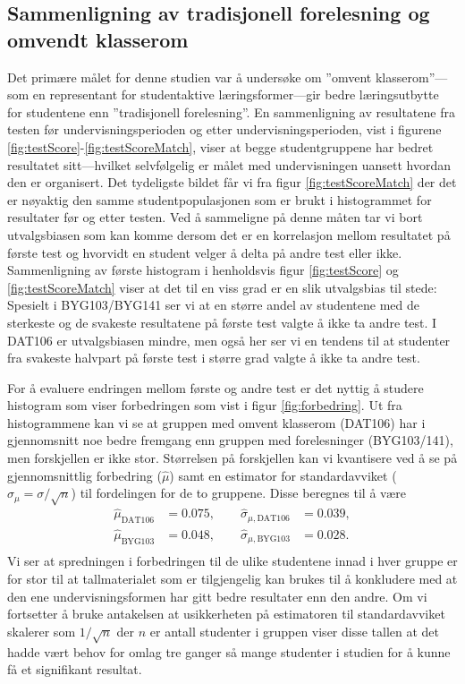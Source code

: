 \documentclass[a4paper,norsk,12pt]{article}
\begin{document}
\subsection{Sammenligning av tradisjonell forelesning og omvendt klasserom}
Det primære målet for denne studien var å undersøke om ''omvent klasserom''---som en representant for studentaktive læringsformer---gir bedre læringsutbytte for studentene enn ''tradisjonell forelesning''. En sammenligning av resultatene fra testen før undervisningsperioden og etter undervisningsperioden, vist i figurene \ref{fig:testScore}-\ref{fig:testScoreMatch}, viser at begge studentgruppene har bedret resultatet sitt---hvilket selvfølgelig er målet med undervisningen uansett hvordan den er organisert. Det tydeligste bildet får vi fra figur \ref{fig:testScoreMatch} der det er nøyaktig den samme studentpopulasjonen som er brukt i histogrammet for resultater før og etter testen. Ved å sammeligne på denne måten tar vi bort utvalgsbiasen som kan komme dersom det er en korrelasjon mellom resultatet på første test og hvorvidt en student velger å delta på andre test eller ikke. Sammenligning av første histogram i henholdsvis figur \ref{fig:testScore} og \ref{fig:testScoreMatch} viser at det til en viss grad er en slik utvalgsbias til stede: Spesielt i BYG103/BYG141 ser vi at en større andel av studentene med de sterkeste og de svakeste resultatene på første test valgte å ikke ta andre test. I DAT106 er utvalgsbiasen mindre, men også her ser vi en tendens til at studenter fra svakeste halvpart på første test i større grad valgte å ikke ta andre test. 

For å evaluere endringen mellom første og andre test er det nyttig å studere histogram som viser forbedringen som vist i figur \ref{fig:forbedring}. Ut fra histogrammene kan vi se at gruppen med omvent klasserom (DAT106) har i gjennomsnitt noe bedre fremgang enn gruppen med forelesninger (BYG103/141), men forskjellen er ikke stor. Størrelsen på forskjellen kan vi kvantisere ved å se på gjennomsnittlig forbedring ($\hat{\mu}$) samt en estimator for standardavviket ($\hat{\sigma}_\mu = \sigma/\sqrt{n}$) til fordelingen for de to gruppene. Disse beregnes til å være
\begin{displaymath}
\begin{aligned}
	\hat{\mu}_\text{DAT106} &= 0.075,\quad\quad \hat{\sigma}_{\mu,\text{DAT106}} &= 0.039, \\
	\hat{\mu}_\text{BYG103} &= 0.048,\quad\quad \hat{\sigma}_{\mu,\text{BYG103}} &= 0.028. \\
\end{aligned}
\end{displaymath}
Vi ser at spredningen i forbedringen til de ulike studentene innad i hver gruppe er for stor til at tallmaterialet som er tilgjengelig kan brukes til å konkludere med at den ene undervisningsformen har gitt bedre resultater enn den andre. Om vi fortsetter å bruke antakelsen at usikkerheten på estimatoren til standardavviket skalerer som $1/\sqrt{n}$ der $n$ er antall studenter i gruppen viser disse tallen at det hadde vært behov for omlag tre ganger så mange studenter i studien for å kunne få et signifikant resultat.
\end{document}
